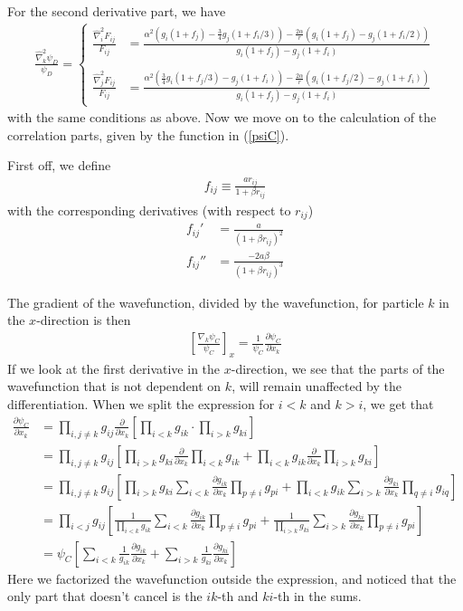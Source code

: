 \documentclass[twocolumn,8pt]{extarticle}
\newcommand{\eq}[1]{{\tiny\begin{align*}#1\end{align*}}}
\newcommand{\equ}[1]{{\tiny\begin{align}#1\end{align}}}
\newcommand{\op}[1]{\hat{#1}}
\begin{document}
For the second derivative part, we have 
\eq{
  \frac{\op\nabla_k^2 \psi_D}{\psi_D} =
  \begin{cases}
    \frac{\op\nabla_i^2 F_{ij}}{F_{ij}}
    &= \frac{\alpha^2 (g_i(1+f_j) 
      - \frac{3}{4} g_j (1+f_i/3)) - \frac{2\alpha}{r}(g_i(1+f_j) - g_j (1+f_i/2))}
      {g_i (1+f_j) - g_j (1+f_i)}\\\\
    \frac{\op\nabla_j^2 F_{ij}}{F_{ij}}
    &= \frac{\alpha^2 (\frac{3}{4}g_i(1+f_j/3) 
      - g_j (1+f_i)) - \frac{2\alpha}{r}(g_i (1+f_j/2) 
      - g_j(1+f_i))}
      {g_i (1+f_j) - g_j (1+f_i)}
  \end{cases}
}
with the same conditions as above.
Now we move on to the calculation of the correlation parts,
given by the function in (\ref{psiC}). 

First off, we define
\eq{
  f_{ij} \equiv \frac{ar_{ij}}{1+\beta r_{ij}}
}
with the corresponding derivatives (with respect to $r_{ij}$)
\eq{
  f_{ij}' &= \frac{a}{(1+\beta r_{ij})^2}\\
  f_{ij}'' &= \frac{-2a\beta}{(1+\beta r_{ij})^3}
}

The gradient of the wavefunction, 
divided by the wavefunction, for particle $k$ in the $x$-direction is then
\eq{
  \left[\frac{\nabla_k\psi_C}{\psi_C}\right]_x 
  =\frac{1}{\psi_C}\frac{\partial\psi_C}{\partial x_k}
}
If we look at the first derivative in the $x$-direction, 
we see that the parts of the wavefunction that is not dependent on $k$, 
will remain unaffected by the 
differentiation.
When we split the expression for $i<k$ and $k>i$, we get that
\equ{
  \frac{\partial\psi_C}{\partial x_k}&=\prod_{i,j\neq k} g_{ij}
    \frac{\partial}{\partial x_k}
    \left[ \prod_{i<k} g_{ik} \cdot \prod_{i>k} g_{ki} \right]\nonumber\\
    &=\prod_{i,j\neq k} g_{ij}
      \left[\prod_{i>k} g_{ki}\frac{\partial}{\partial x_k}\prod_{i<k} g_{ik} 
      + \prod_{i<k} g_{ik} \frac{\partial}{\partial x_k}\prod_{i>k} g_{ki} \right]
      \nonumber\\
    &=\prod_{i,j\neq k} g_{ij}
      \left[\prod_{i>k} g_{ki} \sum_{i<k} \frac{\partial g_{ik}}{\partial x_k} \prod_{p\neq i} g_{pi}
      + \prod_{i<k} g_{ik} \sum_{i>k} \frac{\partial g_{ki}}{\partial x_k} \prod_{q\neq i} g_{iq} \right]
      \nonumber\\
    &=\prod_{i<j} g_{ij}
      \left[\frac{1}{\prod_{i<k} g_{ik}} \sum_{i<k} 
      \frac{\partial g_{ik}}{\partial x_k} \prod_{p\neq i} g_{pi}
      + \frac{1}{\prod_{i>k} g_{ki}} \sum_{i>k} 
      \frac{\partial g_{ki}}{\partial x_k} \prod_{p\neq i} g_{pi} \right]
      \nonumber\\
    &=\psi_C
      \left[\sum_{i<k} \frac{1}{g_{ik}} \frac{\partial g_{ik}}{\partial x_k}
      +\sum_{i>k} \frac{1}{g_{ki}} \frac{\partial g_{ki}}{\partial x_k} \right]
      \label{DpsiC}
}
Here we factorized the wavefunction outside the expression, 
and noticed that the only part that doesn't cancel is the $ik$-th and $ki$-th
in the sums.
\end{document}
